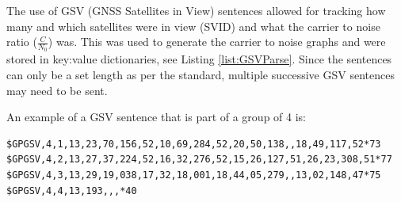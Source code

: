 The use of GSV (GNSS Satellites in View) sentences allowed for tracking how many and which satellites were in view (SVID) and what the carrier to noise ratio ($\frac{C}{N_0}$) was. This was used to generate the carrier to
noise graphs and were stored in key:value dictionaries, see Listing \ref{list:GSVParse}. Since the sentences can only be a set length as per the standard, multiple successive GSV sentences may need to be sent.

An example of a GSV sentence that is part of a group of 4 is:
\begin{verbatim}
$GPGSV,4,1,13,23,70,156,52,10,69,284,52,20,50,138,,18,49,117,52*73
$GPGSV,4,2,13,27,37,224,52,16,32,276,52,15,26,127,51,26,23,308,51*77
$GPGSV,4,3,13,29,19,038,17,32,18,001,18,44,05,279,,13,02,148,47*75
$GPGSV,4,4,13,193,,,*40
\end{verbatim}

